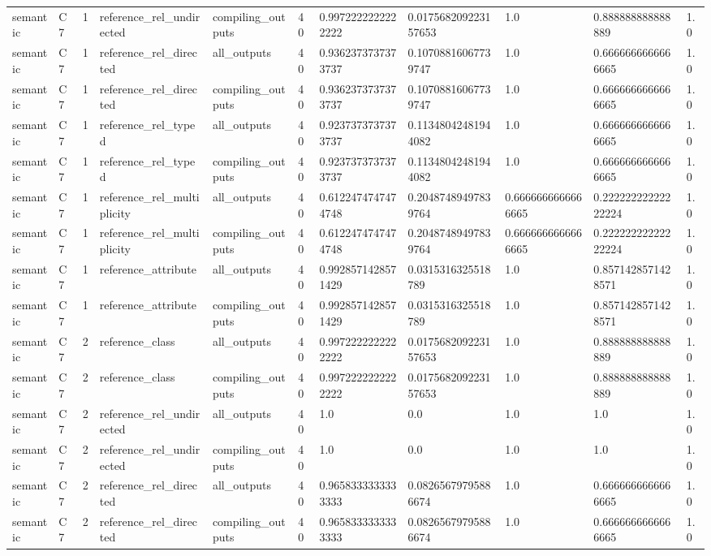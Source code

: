 \begin{tabular}{lllllllllll}
semantic & C7 & 1 & reference\_rel\_undirected & compiling\_outputs & 40 & 0.9972222222222222 & 0.017568209223157653 & 1.0 & 0.888888888888889 & 1.0 \\
semantic & C7 & 1 & reference\_rel\_directed & all\_outputs & 40 & 0.9362373737373737 & 0.10708816067739747 & 1.0 & 0.6666666666666665 & 1.0 \\
semantic & C7 & 1 & reference\_rel\_directed & compiling\_outputs & 40 & 0.9362373737373737 & 0.10708816067739747 & 1.0 & 0.6666666666666665 & 1.0 \\
semantic & C7 & 1 & reference\_rel\_typed & all\_outputs & 40 & 0.9237373737373737 & 0.11348042481944082 & 1.0 & 0.6666666666666665 & 1.0 \\
semantic & C7 & 1 & reference\_rel\_typed & compiling\_outputs & 40 & 0.9237373737373737 & 0.11348042481944082 & 1.0 & 0.6666666666666665 & 1.0 \\
semantic & C7 & 1 & reference\_rel\_multiplicity & all\_outputs & 40 & 0.6122474747474748 & 0.20487489497839764 & 0.6666666666666665 & 0.22222222222222224 & 1.0 \\
semantic & C7 & 1 & reference\_rel\_multiplicity & compiling\_outputs & 40 & 0.6122474747474748 & 0.20487489497839764 & 0.6666666666666665 & 0.22222222222222224 & 1.0 \\
semantic & C7 & 1 & reference\_attribute & all\_outputs & 40 & 0.9928571428571429 & 0.0315316325518789 & 1.0 & 0.8571428571428571 & 1.0 \\
semantic & C7 & 1 & reference\_attribute & compiling\_outputs & 40 & 0.9928571428571429 & 0.0315316325518789 & 1.0 & 0.8571428571428571 & 1.0 \\
semantic & C7 & 2 & reference\_class & all\_outputs & 40 & 0.9972222222222222 & 0.017568209223157653 & 1.0 & 0.888888888888889 & 1.0 \\
semantic & C7 & 2 & reference\_class & compiling\_outputs & 40 & 0.9972222222222222 & 0.017568209223157653 & 1.0 & 0.888888888888889 & 1.0 \\
semantic & C7 & 2 & reference\_rel\_undirected & all\_outputs & 40 & 1.0 & 0.0 & 1.0 & 1.0 & 1.0 \\
semantic & C7 & 2 & reference\_rel\_undirected & compiling\_outputs & 40 & 1.0 & 0.0 & 1.0 & 1.0 & 1.0 \\
semantic & C7 & 2 & reference\_rel\_directed & all\_outputs & 40 & 0.9658333333333333 & 0.08265679795886674 & 1.0 & 0.6666666666666665 & 1.0 \\
semantic & C7 & 2 & reference\_rel\_directed & compiling\_outputs & 40 & 0.9658333333333333 & 0.08265679795886674 & 1.0 & 0.6666666666666665 & 1.0 \\

\end{tabular}
